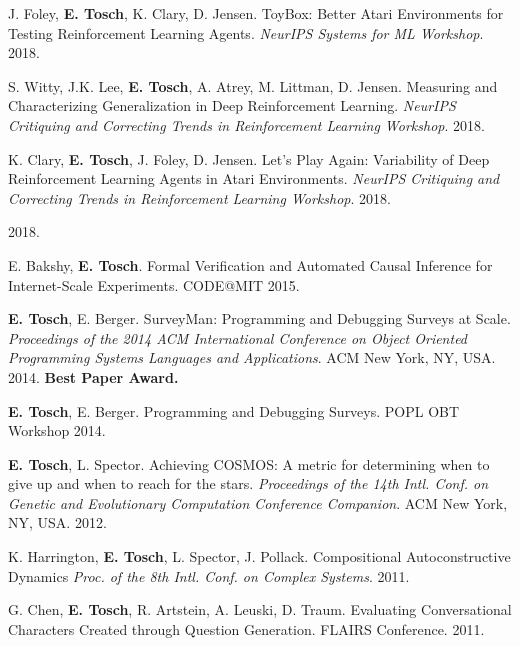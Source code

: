 \documentclass[10pt]{article}
\newcommand{\cvsec}[2]{
    \begin{tcolorbox}[width=\textwidth, breakable, title={#1}]
        #2
    \end{tcolorbox}
    \vspace{10pt}
}
\begin{document}
\cvsec{Publications}{
\hangindent=1cm J. Foley, {\bf E. Tosch}, K. Clary, D. Jensen. ToyBox: Better Atari Environments for Testing Reinforcement Learning Agents. \emph{NeurIPS Systems for ML Workshop}. 2018.

\hangindent=1cm S. Witty, J.K. Lee, {\bf E. Tosch}, A. Atrey, M. Littman, D. Jensen. Measuring and Characterizing Generalization in Deep Reinforcement Learning. \emph{NeurIPS Critiquing and Correcting Trends in Reinforcement Learning Workshop}. 2018.

\hangindent=1cm K. Clary, {\bf E. Tosch}, J. Foley, D. Jensen. Let's Play Again: Variability of Deep Reinforcement Learning Agents in Atari Environments. \emph{NeurIPS Critiquing and Correcting Trends in Reinforcement Learning Workshop}. 2018.

 2018.

\hangindent=1cm E. Bakshy, {\bf E. Tosch}. Formal Verification and Automated Causal Inference for Internet-Scale Experiments. CODE@MIT 2015.

\hangindent=1cm {\bf E. Tosch}, E. Berger. SurveyMan: Programming and Debugging Surveys at Scale. \emph{Proceedings of the 2014 ACM International Conference on Object Oriented Programming Systems Languages and Applications}. ACM New York, NY, USA. 2014. {\bf Best Paper Award.}

\hangindent=1cm {\bf E. Tosch}, E. Berger. Programming and Debugging Surveys. POPL OBT Workshop 2014.

\hangindent=1cm {\bf E. Tosch}, L. Spector. Achieving COSMOS: A metric for determining when to give up and when to reach for the stars. \emph{Proceedings of the 14th Intl. Conf. on Genetic and Evolutionary Computation Conference Companion}. ACM New York, NY, USA. 2012.

\hangindent=1cm K. Harrington, {\bf E. Tosch}, L. Spector, J. Pollack. Compositional Autoconstructive Dynamics \emph{Proc. of the 8th Intl. Conf. on Complex Systems}. 2011.

\hangindent=1cm G. Chen, {\bf E. Tosch}, R. Artstein, A. Leuski, D. Traum. Evaluating Conversational Characters Created through Question Generation. FLAIRS Conference. 2011.
}
\end{document}
